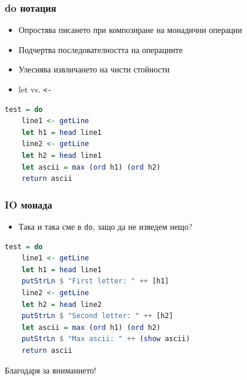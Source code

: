 \documentclass{beamer}
\begin{document}
\begin{frame}[fragile]
  \frametitle{do нотация}
\begin{itemize}
  \item Опростява писането при композиране на монадични операции
  \item Подчертва последователността на операциите
  \item Улеснява извличането на чисти стойности
  \item let vs. \verb#<-#
\end{itemize}
\begin{lstlisting}[basicstyle=\small,language=Haskell]
test = do
    line1 <- getLine
    let h1 = head line1
    line2 <- getLine
    let h2 = head line1
    let ascii = max (ord h1) (ord h2)
    return ascii
\end{lstlisting}
\end{frame}


\begin{frame}[fragile]
  \frametitle{IO монада}
\begin{itemize}
  \item Така и така сме в \verb#do#, защо да не изведем нещо?
\end{itemize}
\begin{lstlisting}[basicstyle=\small,language=Haskell]
test = do
    line1 <- getLine
    let h1 = head line1
    putStrLn $ "First letter: " ++ [h1]
    line2 <- getLine
    let h2 = head line2
    putStrLn $ "Second letter: " ++ [h2]
    let ascii = max (ord h1) (ord h2)
    putStrLn $ "Max ascii: " ++ (show ascii)
    return ascii\end{lstlisting}
\end{frame}



\begin{frame}
  \centerline{Благодаря за вниманието!}
\end{frame}
\end{document}
